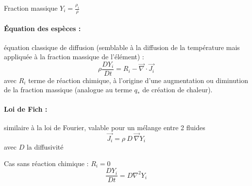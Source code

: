 Fraction massique $Y_i = \frac{\rho_i}{\rho}$

\paragraph{Équation des espèces :} équation classique de diffusion (semblable à la diffusion de la température mais appliquée à la fraction massique de l'élément) :
%
\begin{equation}
\rho \frac{DY_i}{Dt} = R_i - \vec{\nabla} \cdot \vec{J_i}
\end{equation}
%
avec $R_i$ terme de réaction chimique, à l'origine d'une augmentation ou diminution de la fraction massique (analogue au terme $q_*$ de création de chaleur).

\paragraph{Loi de Fich :}similaire à la loi de Fourier, valable pour un mélange entre 2 fluides
%
\begin{equation}
\vec{J_i} = \rho~D~\vec{\nabla} Y_i
\end{equation}
%
avec $D$ la diffusivité

Cas sans réaction chimique : $R_i=0$
%
\begin{equation}
\frac{DY_i}{Dt} = D \nabla^2 Y_i
\end{equation}
